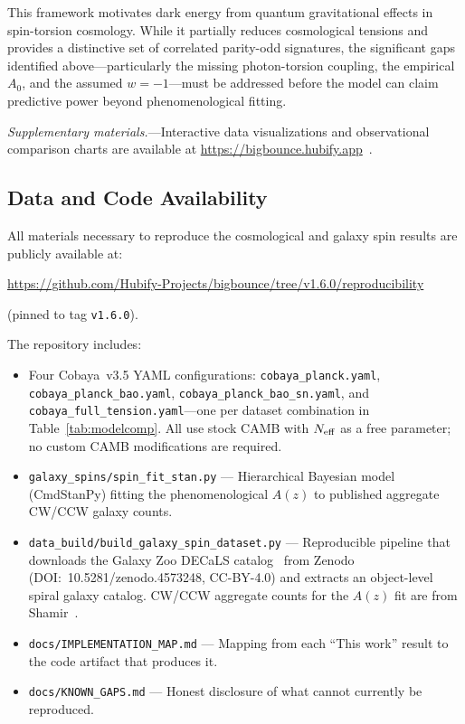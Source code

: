 \documentclass[aps,prd,twocolumn,superscriptaddress,showpacs,preprintnumbers,nofootinbib,longbibliography,floatfix]{revtex4-2}
\newcommand{\Neff}{N_{\rm eff}}
\begin{document}
This framework motivates dark energy from quantum gravitational effects in spin-torsion cosmology. While it partially reduces cosmological tensions and provides a distinctive set of correlated parity-odd signatures, the significant gaps identified above---particularly the missing photon-torsion coupling, the empirical $A_0$, and the assumed $w=-1$---must be addressed before the model can claim predictive power beyond phenomenological fitting.

\textit{Supplementary materials.}---Interactive data visualizations and observational comparison charts are available at \url{https://bigbounce.hubify.app}~\cite{BigBounceWebsite}.

\subsection*{Data and Code Availability}

All materials necessary to reproduce the cosmological and galaxy spin results are publicly available at:
\begin{center}
\url{https://github.com/Hubify-Projects/bigbounce/tree/v1.6.0/reproducibility}
\end{center}
\noindent (pinned to tag \texttt{v1.6.0}).

\noindent The repository includes:
\begin{itemize}[leftmargin=*]
\item Four Cobaya~v3.5 YAML configurations: \texttt{cobaya\_planck.yaml}, \texttt{cobaya\_planck\_bao.yaml}, \texttt{cobaya\_planck\_bao\_sn.yaml}, and \texttt{cobaya\_full\_tension.yaml}---one per dataset combination in Table~\ref{tab:modelcomp}. All use stock CAMB with $\Neff$ as a free parameter; no custom CAMB modifications are required.
\item \texttt{galaxy\_spins/spin\_fit\_stan.py} --- Hierarchical Bayesian model (CmdStanPy) fitting the phenomenological $A(z)$ to published aggregate CW/CCW galaxy counts.
\item \texttt{data\_build/build\_galaxy\_spin\_dataset.py} --- Reproducible pipeline that downloads the Galaxy Zoo DECaLS catalog~\cite{Walmsley2022} from Zenodo (DOI:~10.5281/zenodo.4573248, CC-BY-4.0) and extracts an object-level spiral galaxy catalog. CW/CCW aggregate counts for the $A(z)$ fit are from Shamir~\cite{Shamir2024}.
\item \texttt{docs/IMPLEMENTATION\_MAP.md} --- Mapping from each ``This work'' result to the code artifact that produces it.
\item \texttt{docs/KNOWN\_GAPS.md} --- Honest disclosure of what cannot currently be reproduced.
\end{itemize}
\end{document}
